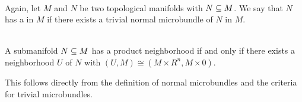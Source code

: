  \\
Again, let $M$ and $N$ be two topological manifolds with $N \subseteq{} M$.
We say that $N$ has a  in $M$ if
there exists a trivial normal microbundle of $N$ in $M$.

 \\
A submanifold $N \subseteq{} M$ has a product neighborhood if and only if there exists a neighborhood $U$ of $N$ with $(U, M) \cong (M \times R^n, M \times 0)$.
\begin{myproof}
This follows directly from the definition of normal microbundles and the criteria for trivial microbundles.
\end{myproof}